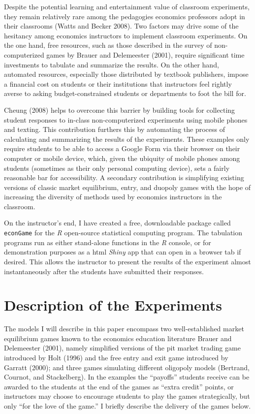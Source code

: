 \documentclass[
]{article}
\begin{document}
Despite the potential learning and entertainment value of classroom
experiments, they remain relatively rare among the pedagogies economics
professors adopt in their classrooms (Watts and Becker 2008). Two
factors may drive some of the hesitancy among economics instructors to
implement classroom experiments. On the one hand, free resources, such
as those described in the survey of non-computerized games by Brauer and
Delemeester (2001), require significant time investments to tabulate and
summarize the results. On the other hand, automated resources,
especially those distributed by textbook publishers, impose a financial
cost on students or their institutions that instructors feel rightly
averse to asking budget-constrained students or departments to foot the
bill for.

Cheung (2008) helps to overcome this barrier by building tools for
collecting student responses to in-class non-computerized experiments
using mobile phones and texting. This contribution furthers this by
automating the process of calculating and summarizing the results of the
experiments. These examples only require students to be able to access a
Google Form via their browser on their computer or mobile device, which,
given the ubiquity of mobile phones among students (sometimes as their
only personal computing device), sets a fairly reasonable bar for
accessibility. A secondary contribution is simplifying existing versions
of classic market equilibrium, entry, and duopoly games with the hope of
increasing the diversity of methods used by economics instructors in the
classroom.

On the instructor's end, I have created a free, downloadable package
called \texttt{econGame} for the \emph{R} open-source statistical
computing program. The tabulation programs run as either stand-alone
functions in the \emph{R} console, or for demonstration purposes as a
html \emph{Shiny} app that can open in a browser tab if desired. This
allows the instructor to present the results of the experiment almost
instantaneously after the students have submitted their responses.

\hypertarget{description-of-the-experiments}{%
\section{Description of the
Experiments}\label{description-of-the-experiments}}

The models I will describe in this paper encompass two well-established
market equilibrium games known to the economics education literature
Brauer and Delemeester (2001), namely simplified versions of the pit
market trading game introduced by Holt (1996) and the free entry and
exit game introduced by Garratt (2000); and three games simulating
different oligopoly models (Bertrand, Cournot, and Stackelberg). In the
examples the ``payoffs'' students receive can be awarded to the students
at the end of the games as ``extra credit'' points, or instructors may
choose to encourage students to play the games strategically, but only
``for the love of the game.'' I briefly describe the delivery of the
games below.
\end{document}
